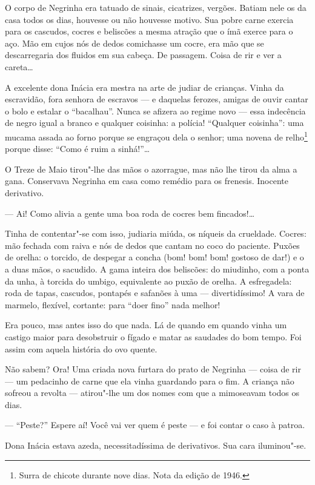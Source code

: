 O corpo de Negrinha era tatuado de sinais, cicatrizes, vergões. Batiam
nele os da casa todos os dias, houvesse ou não houvesse motivo. Sua
pobre carne exercia para os cascudos, cocres e beliscões a mesma atração
que o ímã exerce para o aço. Mão em cujos nós de dedos comichasse um
cocre, era mão que se descarregaria dos fluidos em sua cabeça. De
passagem. Coisa de rir e ver a careta\ldots{}

A excelente dona Inácia era mestra na arte de judiar de crianças. Vinha
da escravidão, fora senhora de escravos --- e daquelas ferozes, amigas
de ouvir cantar o bolo e estalar o ``bacalhau''. Nunca se afizera ao
regime novo --- essa indecência de negro igual a branco e qualquer
coisinha: a polícia! ``Qualquer coisinha'': uma mucama assada ao forno
porque se engraçou dela o senhor; uma novena de relho\footnote{Surra de
  chicote durante nove dias. Nota da edição de 1946.} porque disse:
``Como é ruim a sinhá!''\ldots{}

O Treze de Maio tirou"-lhe das mãos o azorrague, mas não lhe tirou da
alma a gana. Conservava Negrinha em casa como remédio para os frenesis.
Inocente derivativo.

--- Ai! Como alivia a gente uma boa roda de cocres bem fincados!\ldots{}

Tinha de contentar"-se com isso, judiaria miúda, os níqueis da crueldade.
Cocres: mão fechada com raiva e nós de dedos que cantam no coco do
paciente. Puxões de orelha: o torcido, de despegar a concha (bom! bom!
bom! gostoso de dar!) e o a duas mãos, o sacudido. A gama inteira dos
beliscões: do miudinho, com a ponta da unha, à torcida do umbigo,
equivalente ao puxão de orelha. A esfregadela: roda de tapas, cascudos,
pontapés e safanões à uma --- divertidíssimo! A vara de marmelo,
flexível, cortante: para ``doer fino'' nada melhor!

Era pouco, mas antes isso do que nada. Lá de quando em quando vinha um
castigo maior para desobstruir o fígado e matar as saudades do bom
tempo. Foi assim com aquela história do ovo quente.

Não sabem? Ora! Uma criada nova furtara do prato de Negrinha --- coisa
de rir --- um pedacinho de carne que ela vinha guardando para o fim. A
criança não sofreou a revolta --- atirou"-lhe um dos nomes com que a
mimoseavam todos os dias.

--- ``Peste?'' Espere aí! Você vai ver quem é peste --- e foi contar o
caso à patroa.

Dona Inácia estava azeda, necessitadíssima de derivativos. Sua cara
iluminou"-se.

